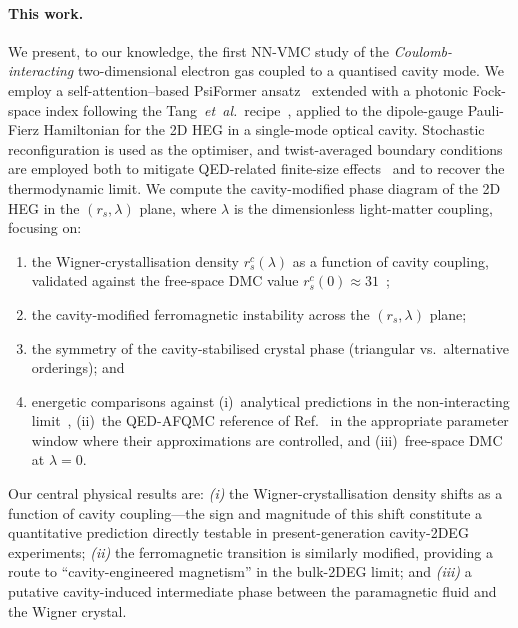 \paragraph*{This work.}
We present, to our knowledge, the first NN-VMC study of the
\emph{Coulomb-interacting} two-dimensional electron gas coupled to a
quantised cavity mode. We employ a self-attention–based PsiFormer
ansatz~\cite{vonGlehn2023} extended with a photonic Fock-space index
following the Tang~\textit{et~al.}\ recipe~\cite{Tang2025}, applied to
the dipole-gauge Pauli-Fierz Hamiltonian for the 2D HEG in a single-mode
optical cavity. Stochastic reconfiguration is used as the optimiser, and
twist-averaged boundary conditions are employed both to mitigate
QED-related finite-size effects~\cite{Weber2025} and to recover the
thermodynamic limit. We compute the cavity-modified phase diagram of
the 2D HEG in the $(r_s, \lambda)$ plane, where $\lambda$ is the
dimensionless light-matter coupling, focusing on:
\begin{enumerate}
    \item the Wigner-crystallisation density $r_s^c(\lambda)$ as a
          function of cavity coupling, validated against the
          free-space DMC value $r_s^c(0) \approx 31$~\cite{DrummondNeeds2009};
    \item the cavity-modified ferromagnetic instability across the
          $(r_s, \lambda)$ plane;
    \item the symmetry of the cavity-stabilised crystal phase
          (triangular vs.\ alternative orderings); and
    \item energetic comparisons against (i)~analytical predictions
          in the non-interacting limit~\cite{Rokaj2022}, (ii)~the
          QED-AFQMC reference of Ref.~\cite{Weber2025} in the
          appropriate parameter window where their approximations are
          controlled, and (iii)~free-space DMC at $\lambda = 0$.
\end{enumerate}

Our central physical results are: \emph{(i)} the Wigner-crystallisation
density shifts as a function of cavity coupling—the sign and magnitude of
this shift constitute a quantitative prediction directly testable in
present-generation cavity-2DEG experiments; \emph{(ii)} the
ferromagnetic transition is similarly modified, providing a route to
``cavity-engineered magnetism'' in the bulk-2DEG limit; and
\emph{(iii)} a putative cavity-induced intermediate phase between the
paramagnetic fluid and the Wigner crystal.

